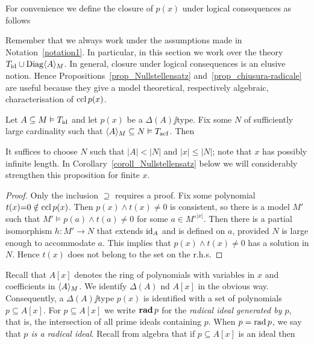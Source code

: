 \documentclass[creche.tex]{subfiles}
\begin{document}
For convenience we define the closure of $p(x)$ under logical consequences as follows


Remember that we always work under the assumptions made in Notation~\ref{notation1}. In particular, in this section we work over the theory $T_{\rm id}\cup\Diag\<A\>_M$. In general, closure under logical consequences is an elusive notion. Hence Propositions~\ref{prop_Nullstellensatz} and~\ref{prop_chiusura-radicale} are useful because they give a model theoretical, respectively algebraic, characterisation of $\ccl\, p(x)$.

\begin{proposition}\label{prop_Nullstellensatz}
Let $A\subseteq M\models T_{\rm id}$ and let $p(x)$ be a $\Delta(A)\jj$type. Fix some $N$ of sufficiently large cardinality such that $\<A\>_M\subseteq N\models T_{\rm acf}$. Then 


\end{proposition}

It suffices to choose $N$ such that $|A|<|N|$ and $|x|\le |N|$; note that $x$ has possibly infinite length. In Corollary~\ref{coroll_Nullstellensatz} below we will considerably strengthen this proposition for finite $x$.

\begin{proof} Only the inclusion $\supseteq$ requires a proof.  Fix some polynomial $t(x){=}0\notin\ccl\, p(x)$. Then $p(x)\wedge t(x)\neq0$ is consistent, so there is a model $M'$ such that $M'\models p(a)\wedge t(a)\neq0$ for some $a\in {M'}^{|x|}$. Then there is a partial isomorphism $h:M'\to N$ that extends $\id_A$ and is defined on $a$, provided $N$ is large enough to accommodate $a$. This implies that $p(x)\wedge t(x)\neq0$ has a solution in $N$. Hence $t(x)$ does not belong to the set on the r.h.s.  
\end{proof}

Recall that $A[x]$ denotes the ring of polynomials with variables in $x$ and coefficients in $\<A\>_M$. We identify $\Delta(A)$ nd $A[x]$ in the obvious way. Consequently, a $\Delta(A)\jj$type $p(x)$ is identified with a set of polynomials $p\subseteq A[x]$. For $p\subseteq A[x]$ we write \emph{${\rm\bf rad}\,p$} for the \emph{radical ideal generated by $p$}, that is, the intersection of all prime ideals containing $p$. When $p=\rad p$, we say that  \emph{$p$ is a radical ideal}. Recall from algebra that if $p\subseteq A[x]$ is an ideal then
\end{document}
